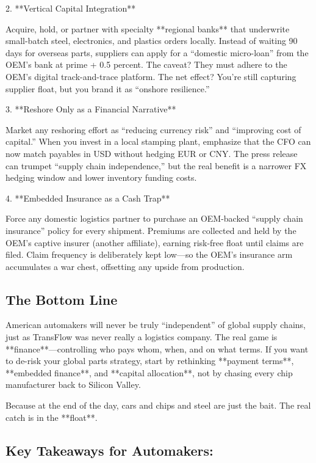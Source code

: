 2. **Vertical Capital Integration**

   Acquire, hold, or partner with specialty **regional banks** that underwrite small-batch steel, electronics, and plastics orders locally. Instead of waiting 90 days for overseas parts, suppliers can apply for a “domestic micro-loan” from the OEM’s bank at prime + 0.5 percent. The caveat? They must adhere to the OEM’s digital track-and-trace platform. The net effect? You’re still capturing supplier float, but you brand it as “onshore resilience.”

3. **Reshore Only as a Financial Narrative**

   Market any reshoring effort as “reducing currency risk” and “improving cost of capital.” When you invest in a local stamping plant, emphasize that the CFO can now match payables in USD without hedging EUR or CNY. The press release can trumpet “supply chain independence,” but the real benefit is a narrower FX hedging window and lower inventory funding costs.

4. **Embedded Insurance as a Cash Trap**

   Force any domestic logistics partner to purchase an OEM-backed “supply chain insurance” policy for every shipment. Premiums are collected and held by the OEM’s captive insurer (another affiliate), earning risk-free float until claims are filed. Claim frequency is deliberately kept low—so the OEM’s insurance arm accumulates a war chest, offsetting any upside from production.


\subsection{The Bottom Line}

American automakers will never be truly “independent” of global supply chains, just as TransFlow was never really a logistics company. The real game is **finance**—controlling who pays whom, when, and on what terms. If you want to de-risk your global parts strategy, start by rethinking **payment terms**, **embedded finance**, and **capital allocation**, not by chasing every chip manufacturer back to Silicon Valley.

Because at the end of the day, cars and chips and steel are just the bait. The real catch is in the **float**.

\subsection{Key Takeaways for Automakers:}

